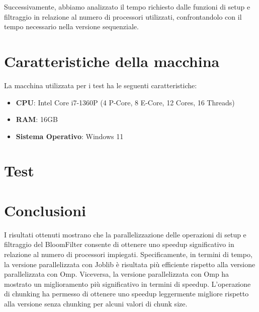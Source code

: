 \documentclass[11pt]{article}
\begin{document}
    Successivamente, abbiamo analizzato il tempo richiesto dalle funzioni di setup e filtraggio in relazione al numero
    di processori utilizzati, confrontandolo con il tempo necessario nella versione sequenziale.
    
    

    \section{Caratteristiche della macchina}\label{sec:caratteristiche-della-macchina}
    La macchina utilizzata per i test ha le seguenti caratteristiche:
    \begin{itemize}
        \item \textbf{CPU}: Intel Core i7-1360P (4 P-Core, 8 E-Core, 12 Cores, 16 Threads)
        \item \textbf{RAM}: 16GB
        \item \textbf{Sistema Operativo}: Windows 11
    \end{itemize}

    \clearpage

    \section{Test}\label{sec:test}
    

    \clearpage
    \section{Conclusioni}\label{sec:conclusioni}
    I risultati ottenuti mostrano che la parallelizzazione delle operazioni di setup e filtraggio del BloomFilter
    consente di ottenere uno speedup significativo in relazione al numero di processori impiegati.
    Specificamente, in termini di tempo, la versione parallelizzata con Joblib è risultata più efficiente rispetto
    alla versione parallelizzata con Omp.
    Viceversa, la versione parallelizzata con Omp ha mostrato un miglioramento più significativo in termini di speedup.
    L'operazione di chunking ha permesso di ottenere uno speedup leggermente migliore rispetto alla versione senza chunking
    per alcuni valori di chunk size.
\end{document}
